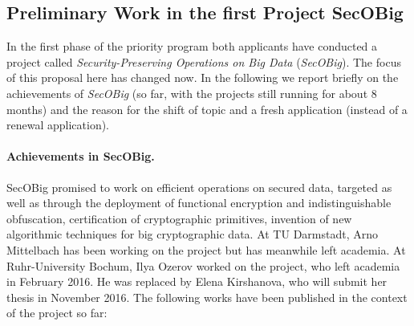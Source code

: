 
\subsection{Preliminary Work in the first Project SecOBig}\label{sec:secobig}

In the first phase of the priority program both applicants have conducted a project called \emph{Security-Preserving Operations on Big Data} (\emph{SecOBig}).  The focus of this proposal here has changed now. In the following we report briefly on the achievements of \emph{SecOBig} (so far, with the projects still running for about 8 months) and the reason for the shift of topic and a fresh application (instead of a renewal application).

\paragraph{Achievements in SecOBig.}
SecOBig promised to work on efficient operations on secured data, targeted as well as through the deployment of functional encryption and indistinguishable obfuscation, certification of cryptographic primitives, invention of new algorithmic techniques for big cryptographic data. At TU Darmstadt, Arno Mittelbach has been working on the project but has meanwhile left academia. At Ruhr-University Bochum, Ilya Ozerov worked on the project, who left academia in February 2016. He was replaced by Elena Kirshanova, who will submit her thesis in November 2016.
%
The following works have been published in the context of the project so far: 

